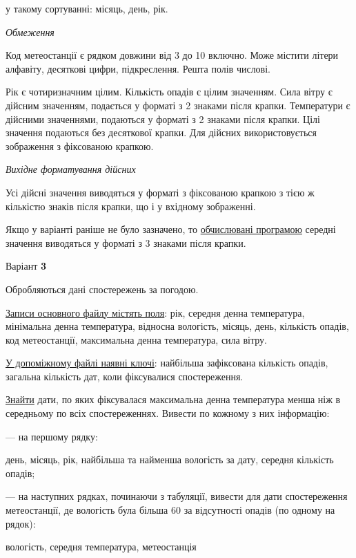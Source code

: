 \documentclass[11pt, ukrainian]{article}
\begin{document}
{\noindent}у такому сортуванні: місяць, день, рік.


\bigskip\textit{Обмеження}

Код метеостанції є рядком довжини від 3 до 10 включно.
Може містити літери алфавіту, десяткові цифри, підкреслення. Решта полів числові.

Рік є чотиризначним цілим.
Кількість опадів є цілим значенням.
Сила вітру є дійсним значенням, подається у форматі з 2 знаками після крапки.
Температури є дійсними значеннями, подаються у форматі з 2 знаками після крапки.
Цілі значення подаються без десяткової крапки.
Для дійсних використовується зображення з фіксованою крапкою.

\textit{Вихідне форматування дійсних}

Усі дійсні значення виводяться у форматі з фіксованою крапкою з тією ж кількістю знаків після крапки, що і у вхідному зображенні.

Якщо у варіанті раніше не було зазначено, то \underline{обчислювані програмою} середні значення виводяться у форматі з 3 знаками після крапки.


\par
\newpage
{\center Варіант  \No \textbf { 3 }\par}
\bigskip
Обробляються дані спостережень за погодою. 

\underline{Записи основного файлу містять поля}: рік, середня денна температура, мінімальна денна температура, відносна вологість, місяць, день, кількість опадів, код метеостанції, максимальна денна температура, сила вітру.

\underline{У допоміжному файлі наявні ключі}: найбільша зафіксована кількість опадів, загальна кількість дат, коли фіксувалися спостереження.

\underline{Знайти} дати, по яких фіксувалася максимальна денна температура менша ніж в середньому по всіх спостереженнях. Вивести по кожному з них інформацію:\par
{\noindent}--- на першому рядку:\par
день, місяць, рік, найбільша та найменша вологість за дату, середня кількість опадів;

{\noindent}--- на наступних рядках, починаючи з табуляції, вивести для дати спостереження метеостанції, де вологість була більша 60 за відсутності опадів (по одному на рядок):\par
вологість, середня температура, метеостанція
\end{document}
